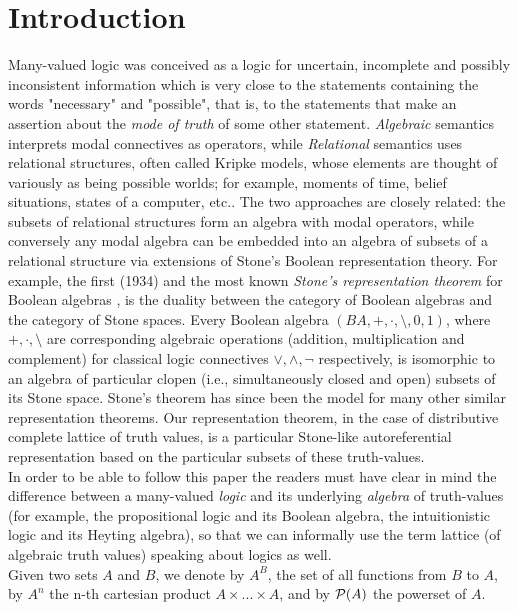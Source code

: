 \documentclass[10pt,twocolumn]{article}
\begin{document}
\section{Introduction}
Many-valued logic was conceived as a logic for uncertain, incomplete
and possibly inconsistent information which is very close to the
statements containing the words "necessary" and "possible", that is,
to the statements that make an assertion about the \emph{mode of
truth} of some other statement. \emph{Algebraic} semantics
interprets modal connectives as operators,
 while \emph{Relational} semantics uses
relational structures, often called Kripke models, whose elements
are thought of variously as being possible worlds; for example,
moments of time, belief situations, states of a computer, etc.. The
two approaches are closely related: the subsets of relational
structures form an algebra with modal operators, while conversely
any modal algebra can be embedded into an algebra of subsets of a
relational structure via extensions of Stone's Boolean
representation theory. For example, the first (1934) and the most
known \emph{Stone's representation theorem} for Boolean algebras
\cite{John82},  is the duality between the category of Boolean
algebras and the category of Stone spaces. Every Boolean algebra
$(BA,+,\cdot, \setminus, 0,1)$, where $+,\cdot,\setminus$ are
corresponding algebraic operations (addition, multiplication and
complement) for classical logic connectives $\vee, \wedge, \neg$
respectively, is isomorphic to an algebra of particular clopen
(i.e., simultaneously closed and open) subsets of its Stone space.
Stone's theorem has since been the model for many other similar
representation theorems. Our representation theorem, in the case of
distributive complete lattice of truth values, is a particular
Stone-like autoreferential representation
based on the particular subsets of these truth-values.\\
In order to be able to follow this paper  the readers must have
clear in mind the difference between a many-valued \emph{logic} and
its underlying \emph{algebra} of truth-values (for example, the
propositional logic and its Boolean algebra, the intuitionistic
logic and its Heyting algebra), so that we can informally use the
term lattice (of algebraic truth values) speaking about logics as
well.\\ Given two sets $A$ and $B$, we  denote by  $A^B$, the set of
all functions from $B$ to $A$,  by $A^n$ the n-th cartesian product
$A \times ...\times A$, and by $\P(A)$ the powerset of $A$.\\
\end{document}
